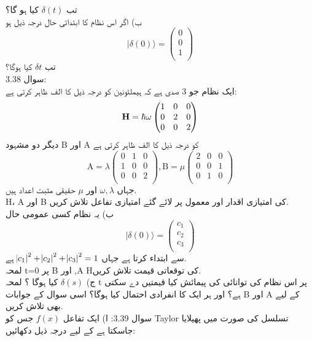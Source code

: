 \documentclass{book}
\begin{document}
تب
\(\delta(t)\)
  کیا ہو گا؟\\
ب) اگر اس نظام کا ابتدائی حال درجہ ذيل ہو
\[| \delta(0)\rangle =\begin{pmatrix}
0\\
0\\
1\\
\end{pmatrix}\]
تب
 \(\delta{t}\)
  کیا ہوگا؟\\
سوال
 3.38:\\
ایک نظام جو 3 صدی ہے کہ ہيملٹونین کو درجہ ذیل کا الف ظاہر کرتی ہے:\\
\[\text{\textbf{H}}=\hbar\omega\begin{pmatrix}
1&0&0\\
0&2&0\\
0&0&2\\
\end{pmatrix}\]
دیگر دو مشہود B اور A کو درجہ ذيل کا الف ظاہر کرتی ہے\\
\[\text{A}=\lambda\begin{pmatrix}
0&1&0\\
1&0&0\\
0&0&2\\
\end{pmatrix} , \text{B}=\mu\begin{pmatrix}
2&0&0\\
0&0&1\\
0&1&0\\
\end{pmatrix}
\]
جہاں
\(\omega, \lambda\)
اور
\(\mu\)
حقیقی مثبت اعداد ہیں.\\
H، A
اور
B
 کی امتیازی اقدار اور معمول پر لائے  گئے امتیازی تفاعل تلاش کریں. \\
ب) یہ نظام کسی عمومی حال
\[| \delta(0)  \rangle=\begin{pmatrix}
c_{1}\\
c_{2}\\
c_{3}\\
\end{pmatrix}\]
سے ابتداء کرتا ہے جہاں
\(\abs{c_{1}}^{2}+\abs{c_{2}}^{2}+\abs{c_{3}}^{2}=1\)
ہے.\\
لمحہ t=0 پر B اور ,A Hکی توقعاتی قیمت تلاش كريں.\\
ج)
 \(\delta(s)\) 
کیا ہوگا ؟
لمحہ t پر اس نظام کی توانائی کی پیمائش کیا قيمتيں دے سکتی ہے؟ اور ہر ایک کا انفرادى احتمال کیا ہوگا؟ اسی سوال کے جوابات B اور A کے لیے بھی تلاش كریں.\\
سوال 3.39:
ا) ایک تفاعل
 \(f(x)\)
 جس کو Taylor تسلسل کی صورت میں پھیلایا جاسکتا ہے کے لیے درجہ ذيل  دکھائیں:\\
\end{document}
